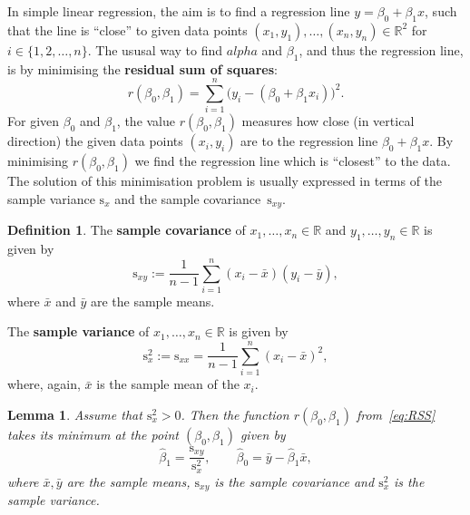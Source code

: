 \documentclass[
  a4paper,
]{article}
\newtheorem{lemma}{Lemma}[section]
\theoremstyle{definition}
\newtheorem{definition}{Definition}[section]
\theoremstyle{definition}
\theoremstyle{definition}
\theoremstyle{definition}
\theoremstyle{remark}
\begin{document}
In simple linear regression, the aim is to find a regression line \(y = \beta_0 + \beta_1 x\), such that the line is ``close'' to given data points
\((x_1, y_1), \ldots, (x_n, y_n) \in\mathbb{R}^2\) for \(i \in \{1, 2, \ldots, n\}\). The ususal way to find \(alpha\) and \(\beta_1\), and thus the regression
line, is by minimising the \textbf{residual sum of squares}:
\begin{equation}
  r(\beta_0, \beta_1)
  = \sum_{i=1}^n \bigl( y_i - (\beta_0 + \beta_1 x_i) \bigr)^2.
  \label{eq:RSS}
\end{equation}
For given \(\beta_0\) and \(\beta_1\), the value \(r(\beta_0, \beta_1)\) measures
how close (in vertical direction) the given data points \((x_i, y_i)\)
are to the regression line \(\beta_0 + \beta_1 x\). By minimising
\(r(\beta_0, \beta_1)\) we find the regression line which is ``closest'' to
the data. The solution of this minimisation problem is usually
expressed in terms of the sample variance \(\mathrm{s}_x\) and the
sample covariance~\(\mathrm{s}_{xy}\).

\begin{definition}
\protect\hypertarget{def:sx}{}\label{def:sx}The \textbf{sample covariance} of \(x_1, \ldots, x_n \in \mathbb{R}\) and
\(y_1, \ldots, y_n\in\mathbb{R}\) is given by
\begin{equation*}
    \mathrm{s}_{xy}
    := \frac{1}{n-1} \sum_{i=1}^n (x_i - \bar x) (y_i - \bar y),
  \end{equation*}
where \(\bar x\) and \(\bar y\) are the sample means.

The \textbf{sample variance} of \(x_1, \ldots, x_n \in \mathbb{R}\) is given by
\begin{equation*}
    \mathrm{s}_{x}^2
    := \mathrm{s}_{xx}
    = \frac{1}{n-1} \sum_{i=1}^n (x_i - \bar x)^2,
  \end{equation*}
where, again, \(\bar x\) is the sample mean of the \(x_i\).
\end{definition}

\begin{lemma}
\protect\hypertarget{lem:simple-LSQ}{}\label{lem:simple-LSQ}Assume that \(\mathrm{s}_x^2 > 0\). Then the function \(r(\beta_0, \beta_1)\)
from~\eqref{eq:RSS} takes its minimum at the point \((\beta_0, \beta_1)\)
given by
\begin{equation*}
    \hat\beta_1 = \frac{\mathrm{s}_{xy}}{\mathrm{s}_x^2},
    \qquad
    \hat\beta_0 = \bar y - \hat \beta_1 \bar x,
  \end{equation*}
where \(\bar x, \bar y\) are the sample means, \(\mathrm{s}_{xy}\) is the
sample covariance and \(\mathrm{s}_x^2\) is the sample variance.
\end{lemma}
\end{document}
